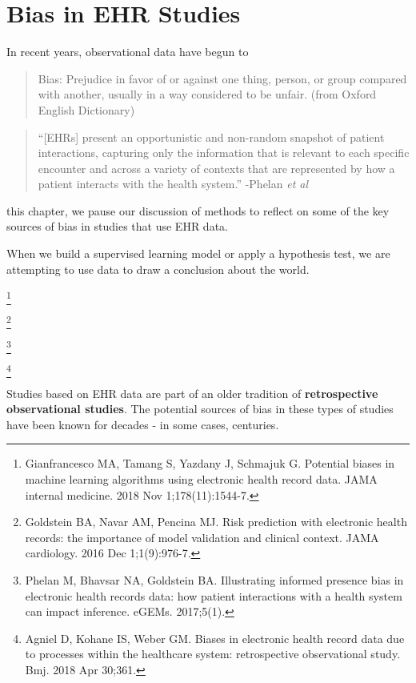 \chapter{Bias in EHR Studies \label{chapter:biasretro}}

In recent years, observational data have begun to 

\begin{quote}
Bias: Prejudice in favor of or against one thing, person, or group compared with another, usually in a way considered to be unfair. (from Oxford English Dictionary)
\end{quote}



\begin{quote}
``[EHRs] present an opportunistic and non-random snapshot of patient interactions, capturing only the information that is relevant to each specific encounter and across a variety of contexts that are represented by how a patient interacts with the health system.'' -Phelan \emph{et al}  
\end{quote}



 this chapter, we pause our discussion of methods to reflect on some of the key sources of bias in studies that use EHR data. 

When we build a supervised learning model or apply a hypothesis test, we are attempting to use data to draw a conclusion about the world. 

\footnote{Gianfrancesco MA, Tamang S, Yazdany J, Schmajuk G. Potential biases in machine learning algorithms using electronic health record data. JAMA internal medicine. 2018 Nov 1;178(11):1544-7.}

\footnote{Goldstein BA, Navar AM, Pencina MJ. Risk prediction with electronic health records: the importance of model validation and clinical context. JAMA cardiology. 2016 Dec 1;1(9):976-7.}

\footnote{Phelan M, Bhavsar NA, Goldstein BA. Illustrating informed presence bias in electronic health records data: how patient interactions with a health system can impact inference. eGEMs. 2017;5(1).}

\footnote{Agniel D, Kohane IS, Weber GM. Biases in electronic health record data due to processes within the healthcare system: retrospective observational study. Bmj. 2018 Apr 30;361.}

Studies based on EHR data are part of an older tradition of \textbf{retrospective observational studies}. The potential sources of bias in these types of studies have been known for decades - in some cases, centuries. 


